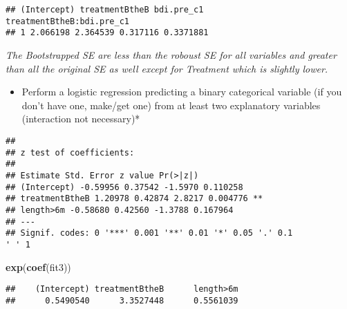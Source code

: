 \documentclass[
]{article}
\newenvironment{Shaded}{\begin{snugshade}}{\end{snugshade}}
\newcommand{\DataTypeTok}[1]{\textcolor[rgb]{0.13,0.29,0.53}{#1}}
\newcommand{\DecValTok}[1]{\textcolor[rgb]{0.00,0.00,0.81}{#1}}
\newcommand{\KeywordTok}[1]{\textcolor[rgb]{0.13,0.29,0.53}{\textbf{#1}}}
\newcommand{\NormalTok}[1]{#1}
\newcommand{\OperatorTok}[1]{\textcolor[rgb]{0.81,0.36,0.00}{\textbf{#1}}}
\newcommand{\StringTok}[1]{\textcolor[rgb]{0.31,0.60,0.02}{#1}}
\providecommand{\tightlist}{%
  \setlength{\itemsep}{0pt}\setlength{\parskip}{0pt}}
\begin{document}
\begin{verbatim}
## (Intercept) treatmentBtheB bdi.pre_c1
treatmentBtheB:bdi.pre_c1
## 1 2.066198 2.364539 0.317116 0.3371881
\end{verbatim}

\emph{The Bootstrapped SE are less than the roboust SE for all variables
and greater than all the original SE as well except for Treatment which
is slightly lower.}

\begin{itemize}
\tightlist
\item
  Perform a logistic regression predicting a binary categorical variable
  (if you don't have one, make/get one) from at least two explanatory
  variables (interaction not necessary)*
\end{itemize}

\begin{Shaded}
\end{Shaded}

\begin{verbatim}
##
## z test of coefficients:
##
## Estimate Std. Error z value Pr(>|z|)
## (Intercept) -0.59956 0.37542 -1.5970 0.110258
## treatmentBtheB 1.20978 0.42874 2.8217 0.004776 **
## length>6m -0.58680 0.42560 -1.3788 0.167964
## ---
## Signif. codes: 0 '***' 0.001 '**' 0.01 '*' 0.05 '.' 0.1
' ' 1
\end{verbatim}

\begin{Shaded}
\begin{Highlighting}[]
\KeywordTok{exp}\NormalTok{(}\KeywordTok{coef}\NormalTok{(fit3))}
\end{Highlighting}
\end{Shaded}

\begin{verbatim}
##    (Intercept) treatmentBtheB      length>6m 
##      0.5490540      3.3527448      0.5561039
\end{verbatim}
\end{document}
